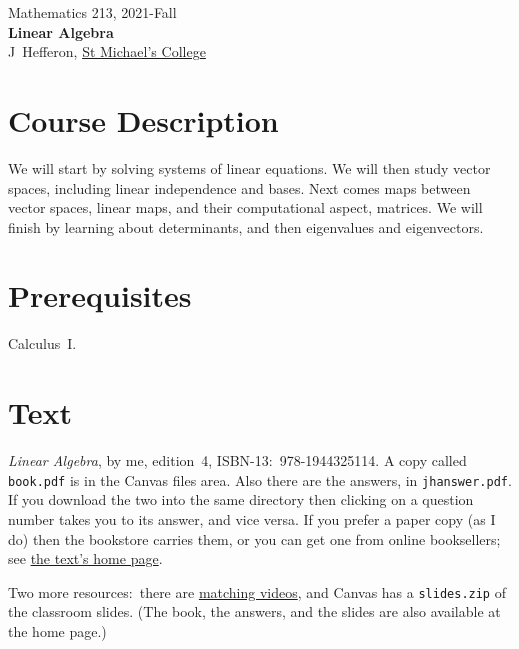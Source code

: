 \documentclass{article}
\begin{document}
 \thispagestyle{empty}
\begin{heading}
  Mathematics 213, 2021-Fall           \\[1.25ex]
  {\large\textbf{Linear Algebra}}   \\[1.25ex]
  J~Hef{}feron, \href{https://www.smcvt.edu/about-smc/directories/employee-directory/jim-hefferon/}{St Michael's College} 
\end{heading}


\section{Course Description}
We will start by solving systems of linear equations.
We will then study vector spaces, including linear independence and bases.
Next comes maps between vector spaces, linear maps, and
their computational aspect, matrices.
We will finish by learning about determinants, and then
eigenvalues and eigenvectors.


\section{Prerequisites}
Calculus~I.


\section{Text}
\textsl{Linear Algebra}, by me, edition~4, ISBN-13:~978-1944325114. 
A copy called \texttt{book.pdf} is in the Canvas files area.
Also there are the answers, in \texttt{jhanswer.pdf}.
If you download the two into 
the same directory then clicking on a question number takes you to its 
answer, and vice versa.
If you prefer a paper copy (as I do) then the bookstore carries them,
or you can get one from online booksellers; see
\href{https://hefferon.net/linearalgebra/}{the text's home page}.

Two more resources:~there are
\href{https://www.youtube.com/watch?v=37tn0z9dSDo&list=PLwF3A0R8OzMoMlE1-SaEh8h9VqUlO-r52}{matching videos},
and Canvas has a \texttt{slides.zip} of the classroom slides.
(The book, the answers, and the slides are also  
available at the home page.)
\end{document}
